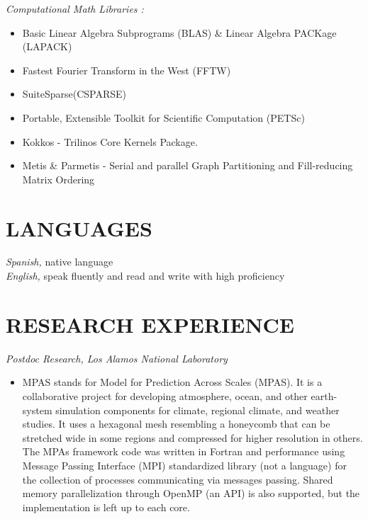 \documentclass[margin]{res}
\begin{document}
\begin{resume}
{\sl Computational Math Libraries :}
  \begin{itemize}  \itemsep -1pt  
      \item Basic Linear Algebra Subprograms (BLAS) \& Linear Algebra PACKage (LAPACK)   
      \item Fastest Fourier Transform in the West (FFTW)
      \item SuiteSparse(CSPARSE)
      \item Portable, Extensible Toolkit for Scientific Computation (PETSc)
      \item Kokkos - Trilinos Core Kernels Package.
      \item Metis \& Parmetis - Serial and parallel Graph Partitioning and Fill-reducing Matrix Ordering
    \end{itemize}
    
\section{LANGUAGES}
{\sl Spanish,} native language\\
{\sl English,} speak fluently and read and write with high proficiency

\section{RESEARCH EXPERIENCE}
{\sl Postdoc Research, Los Alamos National Laboratory} %
\begin{itemize}\itemsep -2pt
\item MPAS stands for Model for Prediction Across Scales (MPAS). It is a collaborative project for developing atmosphere, ocean,  and other earth-system simulation components for climate, regional climate, and weather studies. It uses a hexagonal mesh resembling a honeycomb that can be stretched wide in some regions and compressed for higher resolution in others.
The MPAs framework code was written in Fortran and performance using Message Passing Interface (MPI)  standardized library (not a language) for the collection of processes communicating via messages passing. Shared memory parallelization through OpenMP (an API) is also supported, but the implementation is left up to each core.  
\end{itemize}



\end{resume}
\end{document}
